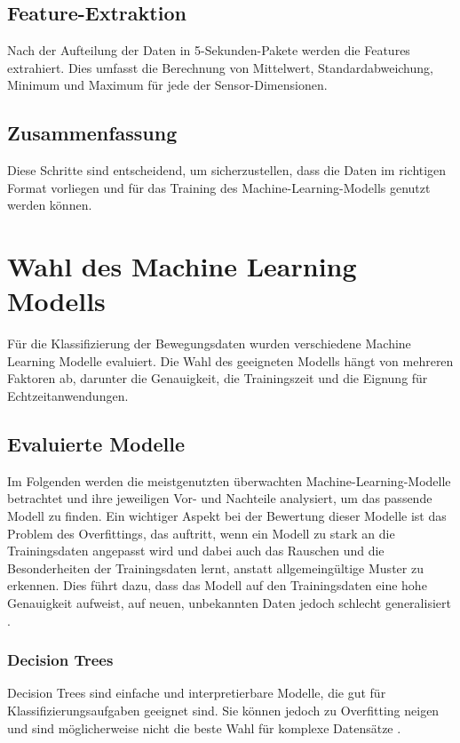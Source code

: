 \subsection{Feature-Extraktion}
Nach der Aufteilung der Daten in 5-Sekunden-Pakete werden die Features extrahiert. Dies umfasst die Berechnung von Mittelwert, Standardabweichung, Minimum und Maximum für jede der Sensor-Dimensionen. 

\subsection{Zusammenfassung}
Diese Schritte sind entscheidend, um sicherzustellen, dass die Daten im richtigen Format vorliegen und für das Training des Machine-Learning-Modells genutzt werden können.

\section{Wahl des Machine Learning Modells}
Für die Klassifizierung der Bewegungsdaten wurden verschiedene Machine Learning Modelle evaluiert. Die Wahl des geeigneten Modells hängt von mehreren Faktoren ab, darunter die Genauigkeit, die Trainingszeit und die Eignung für Echtzeitanwendungen.

\subsection{Evaluierte Modelle}
Im Folgenden werden die meistgenutzten überwachten Machine-Learning-Modelle betrachtet und ihre jeweiligen Vor- und Nachteile analysiert, um das passende Modell zu finden. Ein wichtiger Aspekt bei der Bewertung dieser Modelle ist das Problem des Overfittings, das auftritt, wenn ein Modell zu stark an die Trainingsdaten angepasst wird und dabei auch das Rauschen und die Besonderheiten der Trainingsdaten lernt, anstatt allgemeingültige Muster zu erkennen. Dies führt dazu, dass das Modell auf den Trainingsdaten eine hohe Genauigkeit aufweist, auf neuen, unbekannten Daten jedoch schlecht generalisiert \cite{dietterich1995overfitting}.

\subsubsection{Decision Trees}
Decision Trees sind einfache und interpretierbare Modelle, die gut für Klassifizierungsaufgaben geeignet sind. Sie können jedoch zu Overfitting neigen und sind möglicherweise nicht die beste Wahl für komplexe Datensätze \cite{kingsford2008decision}.

